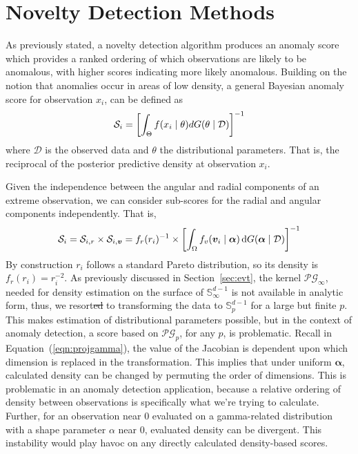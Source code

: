 \section{Novelty Detection Methods\label{sec:novelty}}
As previously stated, a novelty detection algorithm produces an anomaly score 
    which provides a ranked ordering of which observations are likely to be 
    anomalous, with higher scores indicating more likely anomalous. Building on 
    the notion that anomalies occur in areas of low density, a general Bayesian
    anomaly score for observation $x_i$, can be defined as
    \[
    \mathcal{S}_i = \left[\int_{\Theta}f(x_i\mid\theta)dG(\theta\mid\mathcal{D})\right]^{-1}
    \]
    where $\mathcal{D}$ is the observed data and $\theta$ the distributional
    parameters.  That is, the reciprocal of the posterior predictive density 
    at observation $x_i$.

Given the independence between the angular and radial components of an
    extreme observation, we can consider sub-scores for the radial 
    and angular components independently.  That is,
    \[
        \mathcal{S}_i = \mathcal{S}_{i,r}\times \mathcal{S}_{i,\bm{v}} = 
            f_r(r_i)^{-1}\times
            \left[\int_{\Omega} f_v(\bm{v}_i\mid\bm{\alpha})
                \,\text{d}G(\bm{\alpha}\mid\mathcal{D})\right]^{-1}
    \]
    By construction $r_i$ follows a standard Pareto distribution, so its
    density is $f_r(r_i) = r_i^{-2}$.  As previously discussed in
    Section~\ref{sec:evt}, the kernel $\mathcal{PG}_\infty$, needed for 
    density estimation on the surface of ${\mathbb S}_{\infty}^{d-1}$ is 
    not available in analytic form, thus, we resort\st{ed} to transforming the
    data to $\mathbb{S}_p^{d-1}$ for a large but finite $p$.
    This makes estimation of distributional parameters possible, 
    but in the context of anomaly detection, a score based on
    $\mathcal{PG}_p$, for any $p$, is problematic.  Recall in 
    Equation~(\ref{eqn:projgamma}), the value of the Jacobian is dependent
    upon which dimension is replaced in the transformation.  This implies that
    under uniform $\bm{\alpha}$, calculated density can be changed by
    permuting the order of dimensions.  This is problematic in an anomaly
    detection application, because a relative ordering of density between 
    observations is specifically what we're trying to calculate.
    Further, for an observation near 0 evaluated on a gamma-related distribution 
    with a shape parameter $\alpha$ near 0, evaluated density can be divergent.
    This instability would play havoc on any directly 
    calculated density-based scores.

